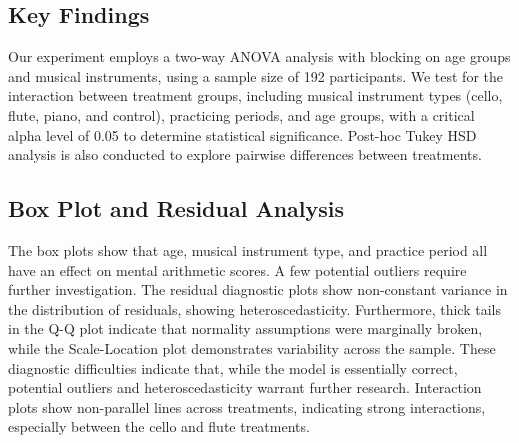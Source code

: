 \documentclass[11pt]{article}
\begin{document}
\subsection*{Key Findings}
Our experiment employs a two-way ANOVA analysis with blocking on age groups and musical instruments, using a sample size of 192 participants. We test for the interaction between treatment groups, including musical instrument types (cello, flute, piano, and control), practicing periods, and age groups, with a critical alpha level of 0.05 to determine statistical significance. Post-hoc Tukey HSD analysis is also conducted to explore pairwise differences between treatments.



\subsection*{Box Plot and Residual Analysis}
The box plots show that age, musical instrument type, and practice period all have an effect on mental arithmetic scores. A few potential outliers require further investigation. The residual diagnostic plots show non-constant variance in the distribution of residuals, showing heteroscedasticity. Furthermore, thick tails in the Q-Q plot indicate that normality assumptions were marginally broken, while the Scale-Location plot demonstrates variability across the sample. These diagnostic difficulties indicate that, while the model is essentially correct, potential outliers and heteroscedasticity warrant further research. Interaction plots show non-parallel lines across treatments, indicating strong interactions, especially between the cello and flute treatments. 
\end{document}
